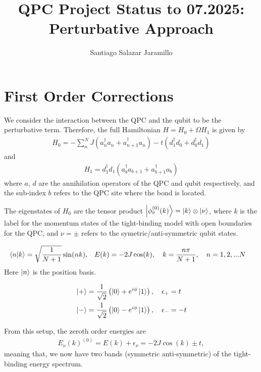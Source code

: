 \documentclass{article}
\title{QPC Project Status to 07.2025: Perturbative Approach}
\author{Santiago Salazar Jaramillo}
\date{}
\begin{document}
\maketitle

\section{First Order Corrections}

We consider the interaction between the QPC and the qubit to be the perturbative term. Therefore, the full Hamiltonian $H = H_0 + \Omega H_1$ is given by
\begin{align}
    H_0 = -\sum_{n}^{N}J(a_{n}^{\dagger} a_{n} + a_{n+1}^{\dagger}a_{n} ) - t(d_{1}^{\dagger}d_{0}+d_{0}^{\dagger}d_{1})
\end{align}
and 
\begin{align}
    H_1 = d_{1}^{\dagger}d_{1}( a_{b}^{\dagger}a_{b+1} + a^{\dagger}_{b+1}a_{b} )
\end{align}
where $a$, $d$ are the annihilation operators of the QPC and qubit respectively, and the sub-index $b$ refers to the QPC site where the bond is located. 

The eigenstates of $H_0$ are the tensor product $\ket{\phi^{(0)}_\nu (k)} = \ket{k}\otimes \ket{\nu}$, where $k$ is the label for the momentum states of the tight-binding model with open boundaries for the QPC, and $\nu = \pm$ refers to the symetric/anti-symmetric qubit states. 

\begin{tcolorbox}[title=QPC eigenstates, colback=white, colframe=black]
\begin{align}
    \bra{n}\ket{k} = \sqrt{\frac{1}{N+1}} \sin(n k) ,\quad & E(k) = -2J\cos(k), \quad k = \frac{n\pi}{N+1},\quad n= 1, 2,...N
\end{align}
Here $\ket{n}$ is the position basis.
\end{tcolorbox}

\begin{tcolorbox}[title=Qubit eigenstates, colback=white, colframe=black]
\begin{align}
   & \ket{+} = \frac{1}{\sqrt{2}}\left( \ket{0} + e^{i\phi} \ket{1}\right), \quad \epsilon_+ = t \\
   & \ket{-} = \frac{1}{\sqrt{2}}\left( \ket{0} - e^{i\phi} \ket{1}\right), \quad \epsilon_- = -t
\end{align}
\end{tcolorbox}

From this setup, the zeroth order energies are 
\begin{align}
   E_{\nu}(k)^{(0)} = E(k) + \epsilon_\nu = -2J\cos(k)\pm t,
\end{align}
meaning that, we now have two bands (symmetric anti-symmetric) of the tight-binding energy spectrum.
\end{document}
